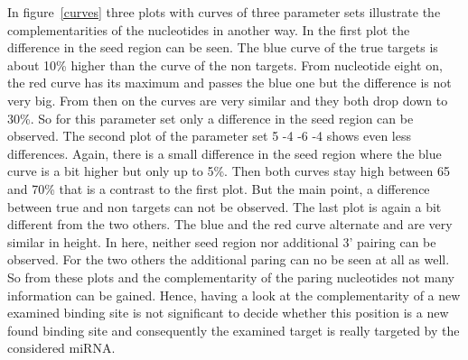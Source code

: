 \documentclass[12pt]{article}
\begin{document}
In figure~\ref{curves} three plots with curves of three parameter sets illustrate the complementarities of the nucleotides in another way. In the first plot the difference in the seed region can be seen. The blue curve of the true targets is about 10\% higher than the curve of the non targets. From nucleotide eight on, the red curve has its maximum and passes the blue one but the difference is not very big. From then on the curves are very similar and they both drop down to 30\%. So for this parameter set only a difference in the seed region can be observed. 
The second plot of the parameter set 5 -4 -6 -4 shows even less differences. Again, there is a small difference in the seed region where the blue curve is a bit higher but only up to 5\%. Then both curves stay high between 65 and 70\% that is a contrast to the first plot. But the main point, a difference between true and non targets can not be observed.
The last plot is again a bit different from the two others. The blue and the red curve alternate and are very similar in height. In here, neither seed region nor additional 3' pairing can be observed. For the two others the additional paring can no be seen at all as well. So from these plots and the complementarity of the paring nucleotides not many information can be gained. Hence, having a look at the complementarity of a new examined binding site is not significant to decide whether this position is a new found binding site and consequently the examined target is really targeted by the considered miRNA.\\
\end{document}
